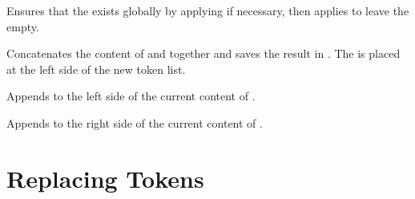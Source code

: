 \documentclass[oneside]{book}
\begin{document}
\begin{function}{\TlClearNew}
\begin{syntax}
 
\end{syntax}
Ensures that the  exists globally by applying
 if necessary, then applies  to leave
the  empty.
\begin{codehigh}
\TlClearNew \lFooSomeTl
\end{codehigh}
\end{function}

\begin{function}{\TlConcat}
\begin{syntax}
   
\end{syntax}
Concatenates the content of  and 
together and saves the result in . The 
is placed at the left side of the new token list.
\begin{demohigh}
\TlSet {}
\TlSet {}
\TlConcat \lTmpaTl \lTmpbTl \lTmpcTl
\TlUse \lTmpaTl
\end{demohigh}
\end{function}

\begin{function}{\TlPutLeft}
\begin{syntax}
  
\end{syntax}
Appends  to the left side of the current content of .
\begin{demohigh}
\TlSet {}
\TlPutLeft {}
\TlUse \lTmpkTl
\end{demohigh}
\end{function}

\begin{function}{\TlPutRight}
\begin{syntax}
  
\end{syntax}
Appends  to the right side of the current content of .
\begin{demohigh}
\TlSet {}
\TlPutRight {}
\TlUse \lTmpkTl
\end{demohigh}
\end{function}

\section{Replacing Tokens}
\end{document}
